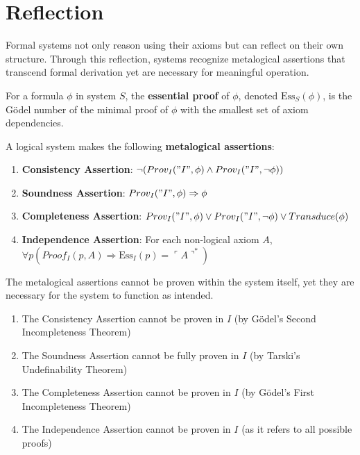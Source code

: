 \documentclass[runningheads]{llncs}
\begin{document}
\section{Reflection}

Formal systems not only reason using their axioms but can reflect on their own structure. Through this reflection, systems recognize metalogical assertions that transcend formal derivation yet are necessary for meaningful operation.

\begin{definition}
For a formula $\phi$ in system $S$, the \textbf{essential proof} of $\phi$, denoted $\text{Ess}_S(\phi)$, is the Gödel number of the minimal proof of $\phi$ with the smallest set of axiom dependencies.
\end{definition}

\medskip

\begin{definition}
A logical system makes the following \textbf{metalogical assertions}:
\begin{enumerate}
    \item \textbf{Consistency Assertion}: $\neg(Prov_I("I", \phi) \land Prov_I("I", \neg\phi))$
    \item \textbf{Soundness Assertion}: $Prov_I("I", \phi) \Rightarrow \phi$
    \item \textbf{Completeness Assertion}: $Prov_I("I", \phi) \lor Prov_I("I", \neg\phi) \lor Transduce(\phi)$
    \item \textbf{Independence Assertion}: For each non-logical axiom $A$, $\forall p (Proof_I(p, A) \Rightarrow \text{Ess}_I(p) = \ulcorner A \urcorner^*)$
\end{enumerate}
\end{definition}

\medskip

\begin{theorem}
The metalogical assertions cannot be proven within the system itself, yet they are necessary for the system to function as intended.
\begin{enumerate}
    \item The Consistency Assertion cannot be proven in $I$ (by Gödel's Second Incompleteness Theorem)
    \item The Soundness Assertion cannot be fully proven in $I$ (by Tarski's Undefinability Theorem)
    \item The Completeness Assertion cannot be proven in $I$ (by Gödel's First Incompleteness Theorem)
    \item The Independence Assertion cannot be proven in $I$ (as it refers to all possible proofs)
\end{enumerate}
\end{theorem}
\end{document}
